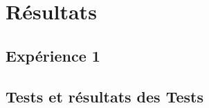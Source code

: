 \chapter{Résultats}

\section{Expérience 1}

\lipsum  %


\section{Tests et résultats des Tests}

\lipsum  %
